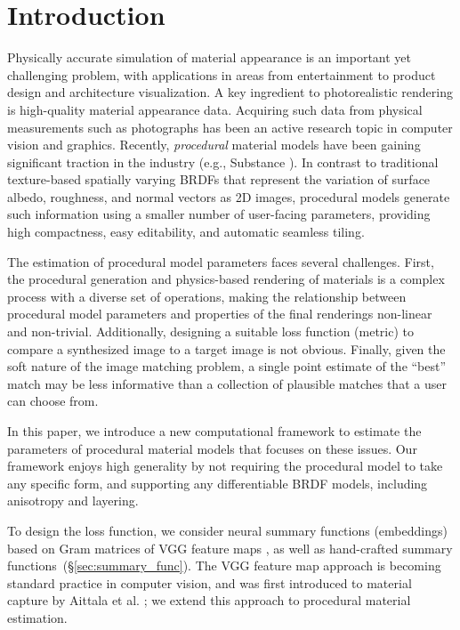 \section{Introduction}
\label{sec:intro}
%
Physically accurate simulation of material appearance is an important yet challenging problem, with applications in areas from entertainment to product design and architecture visualization.
A key ingredient to photorealistic rendering is high-quality material appearance data.
Acquiring such data from physical measurements such as photographs has been an active research topic in computer vision and graphics. Recently, \emph{procedural} material models have been gaining significant traction in the industry (e.g., Substance \cite{Substance}).
In contrast to traditional texture-based spatially varying BRDFs that represent the variation of surface albedo, roughness, and normal vectors as 2D images, procedural models generate such information using a smaller number of user-facing parameters, providing high compactness, easy editability, and automatic seamless tiling.

The estimation of procedural model parameters faces several challenges. First, the procedural generation and physics-based rendering of materials is a complex process with a diverse set of operations, making the relationship between procedural model parameters and properties of the final renderings non-linear and non-trivial.
Additionally, designing a suitable loss function (metric) to compare a synthesized image to a target image is not obvious. Finally, given the soft nature of the image matching problem, a single point estimate of the ``best'' match may be less informative than a collection of plausible matches that a user can choose from.

In this paper, we introduce a new computational framework to estimate the parameters of procedural material models that focuses on these issues.
Our framework enjoys high generality by not requiring the procedural model to take any specific form, and supporting any differentiable BRDF models, including anisotropy and layering.

To design the loss function, we consider neural summary functions (embeddings) based on Gram matrices of VGG feature maps \cite{Gatys2015,Gatys2016}, as well as hand-crafted summary functions~(\S\ref{sec:summary_func}). The VGG feature map approach is becoming standard practice in computer vision, and was first introduced to material capture by Aittala et al. \cite{Aittala2016}; we extend this approach to procedural material estimation.

